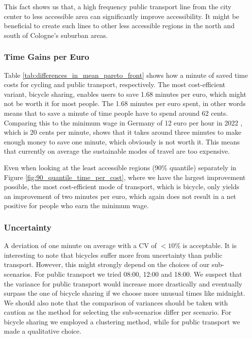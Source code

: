 This fact shows us that, a high frequency public transport line from the city center to less accessible area can significantly improve accessibility.
It might be beneficial to create such lines to other less accessible regions in the north and south of Cologne's suburban areas.


\subsubsection{Time Gains per Euro}

Table \ref{tab:differences_in_mean_pareto_front} shows how a minute of saved time costs for cycling and public transport, respectively.
The most cost-efficient variant, bicycle sharing, enables users to save 1.68 minutes per euro, which might not be worth it for most people.
The 1.68 minutes per euro spent, in other words means that to save a minute of time people have to spend around 62 cents.
Comparing this to the minimum wage in Germany of 12 euro per hour in 2022 \cite{federalstatisticalofficegermanyMinimumWages}, which is 20 cents per minute, shows that it takes around three minutes to make enough money to save one minute, which obviously is not worth it.
This means that currently on average the sustainable modes of travel are too expensive.

Even when looking at the least accessible regions (90\% quantile) separately in Figure \ref{fig:90_quantile_time_per_cost}, where we have the largest improvement possible, the most cost-efficient mode of transport, which is bicycle, only yields an improvement of two minutes per euro, which again does not result in a net positive for people who earn the minimum wage.



\subsubsection{Uncertainty}

A deviation of one minute on average with a CV of $<10\%$ is acceptable.
It is interesting to note that bicycles suffer more from uncertainty than public transport. 
However, this might strongly depend on the choices of our sub-scenarios. 
For public transport we tried 08:00, 12:00 and 18:00.
We suspect that the variance for public transport would increase more drastically and eventually surpass the one of bicycle sharing if we choose more unusual times like midnight.
We should also note that the comparison of variances should be taken with caution as the method for selecting the sub-scenarios differ per scenario.
For bicycle sharing we employed a clustering method, while for public transport we made a qualitative choice. 


